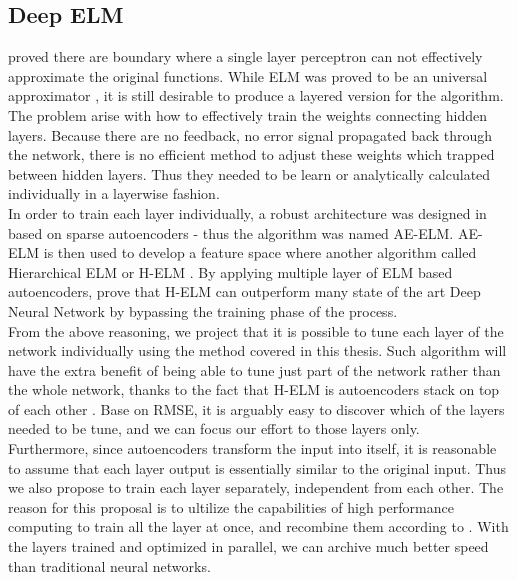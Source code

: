\documentclass[13pt]{article}
\begin{document}
\subsection{Deep ELM}
\cite{newell_perceptrons._1969} proved there are boundary where a single layer perceptron can not effectively approximate the original functions. While ELM was proved to be an universal approximator \cite{huang_extreme_2016}, it is still desirable to produce a layered version for the algorithm.\\
The problem arise with how to effectively train the weights connecting hidden layers. Because there are no feedback, no error signal propagated back through the network, there is no efficient method to adjust these weights which trapped between hidden layers. Thus they needed to be learn or analytically calculated individually in a layerwise fashion.\\
In order to train each layer individually, a robust architecture was designed in \cite{cao_building_2016} based on sparse autoencoders - thus the algorithm was named AE-ELM. AE-ELM is then used to develop a feature space where another algorithm called Hierarchical ELM or H-ELM \cite{tang_extreme_2016}. By applying multiple layer of ELM based autoencoders, \cite{tang_extreme_2016} prove that H-ELM can outperform many state of the art Deep Neural Network by bypassing the training phase of the process.\\
From the above reasoning, we project that it is possible to tune each layer of the network individually using the method covered in this thesis. Such algorithm will have the extra benefit of being able to tune just part of the network rather than the whole network, thanks to the fact that H-ELM is autoencoders stack on top of each other \cite{tang_extreme_2016}. Base on RMSE, it is arguably easy to discover which of the layers needed to be tune, and we can focus our effort to those layers only.\\
Furthermore, since autoencoders transform the input into itself, it is reasonable to assume that each layer output is essentially similar to the original input. Thus we also propose to train each layer separately, independent from each other. The reason for this proposal is to ultilize the capabilities of high performance computing to train all the layer at once, and recombine them according to \cite{cao_building_2016}. With the layers trained and optimized in parallel, we can archive much better speed than traditional neural networks.
\end{document}
